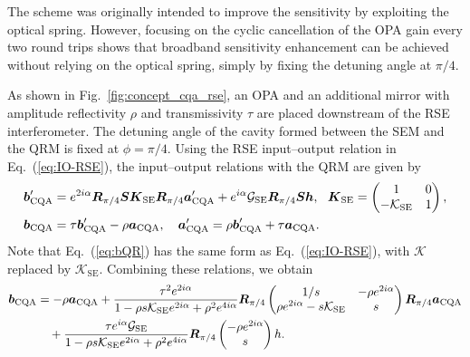 \documentclass{iopjournal}
\begin{document}
The scheme was originally intended to improve the sensitivity by exploiting the optical spring. However, focusing on the cyclic cancellation of the OPA gain every two round trips shows that broadband sensitivity enhancement can be achieved without relying on the optical spring, simply by fixing the detuning angle at $\pi/4$. 

As shown in Fig.~\ref{fig:concept_cqa_rse}, an OPA and an additional
mirror with amplitude reflectivity \(\rho\) and transmissivity \(\tau\)
are placed downstream of the RSE interferometer. The
detuning angle of the cavity formed between the SEM and the QRM is
fixed at \(\phi=\pi/4\). Using the RSE input--output relation in
Eq.~(\ref{eq:IO-RSE}), the input--output relations with the QRM are given
by
\begin{align}
\boldsymbol{b}'_{\rm CQA}
&=
e^{2i\alpha}
\boldsymbol{R}_{\pi/4}
\boldsymbol{S}
\boldsymbol{K}_{\rm SE}
\boldsymbol{R}_{\pi/4}
\boldsymbol{a}'_{\rm CQA}
+
e^{i\alpha}\mathcal{G}_{\rm SE}
\boldsymbol{R}_{\pi/4}
\boldsymbol{S}\boldsymbol{h},
\ \ \boldsymbol{K}_{\rm SE}
=
\begin{pmatrix}
1 & 0\\
-\mathcal{K}_{\rm SE} & 1
\end{pmatrix}\label{eq:bQR},\\
\boldsymbol{b}_{\rm CQA}
&=
\tau\boldsymbol{b}'_{\rm CQA}
-\rho\boldsymbol{a}_{\rm CQA},
\ \ \ 
\boldsymbol{a}'_{\rm CQA}
=
\rho\boldsymbol{b}'_{\rm CQA}
+\tau\boldsymbol{a}_{\rm CQA}.
\label{eq:IO-QRM}
\end{align}
Note that Eq.~(\ref{eq:bQR}) has the same form as Eq.~(\ref{eq:IO-RSE}), with $\mathcal{K}$ replaced by $\mathcal{K}_\mathrm{SE}$. Combining these relations, we obtain
\begin{align}
\boldsymbol b_{\rm CQA}
&=
-\rho\boldsymbol a_{\rm CQA}
+
\frac{\tau^2e^{2i\alpha}}
{1-\rho s\mathcal K_{\rm SE}e^{2i\alpha}
+\rho^2e^{4i\alpha}}
\boldsymbol R_{\pi/4}
\begin{pmatrix}
1/s & -\rho e^{2i\alpha}\\
\rho e^{2i\alpha}-s\mathcal K_{\rm SE} & s
\end{pmatrix}
\boldsymbol R_{\pi/4}
\boldsymbol a_{\rm CQA}
\nonumber\\
&\quad+
\frac{\tau e^{i\alpha}\mathcal G_{\rm SE}}
{1-\rho s\mathcal K_{\rm SE}e^{2i\alpha}
+\rho^2e^{4i\alpha}}
\boldsymbol R_{\pi/4}
\begin{pmatrix}
-\rho e^{2i\alpha}\\
s
\end{pmatrix}
 h.
\label{eq:IO-CQA}
\end{align}
\end{document}
